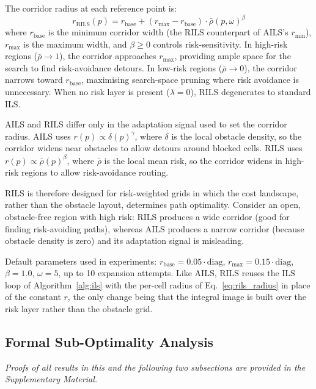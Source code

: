 \documentclass[preprint,12pt,authoryear]{elsarticle}
\begin{document}
The corridor radius at each reference point is:
\begin{equation}\label{eq:rils_radius}
    r_{\text{RILS}}(p) = r_{\text{base}} + (r_{\max} - r_{\text{base}}) \cdot \bar{\rho}(p, \omega)^\beta
\end{equation}
where $r_{\text{base}}$ is the minimum corridor width (the RILS counterpart of AILS's $r_{\min}$), $r_{\max}$ is the maximum width, and $\beta \geq 0$ controls risk-sensitivity.
In high-risk regions ($\bar{\rho} \to 1$), the corridor approaches $r_{\max}$, providing ample space for the search to find risk-avoidance detours.
In low-risk regions ($\bar{\rho} \to 0$), the corridor narrows toward $r_{\text{base}}$, maximising search-space pruning where risk avoidance is unnecessary.
When no risk layer is present ($\lambda = 0$), RILS degenerates to standard ILS.

AILS and RILS differ only in the adaptation signal used to set the corridor radius. AILS uses $r(p) \propto \delta(p)^\gamma$, where $\delta$ is the local obstacle density, so the corridor widens near obstacles to allow detours around blocked cells. RILS uses $r(p) \propto \bar{\rho}(p)^\beta$, where $\bar{\rho}$ is the local mean risk, so the corridor widens in high-risk regions to allow risk-avoidance routing.

RILS is therefore designed for risk-weighted grids in which the cost landscape, rather than the obstacle layout, determines path optimality.
Consider an open, obstacle-free region with high risk: RILS produces a wide corridor (good for finding risk-avoiding paths), whereas AILS produces a narrow corridor (because obstacle density is zero) and its adaptation signal is misleading.

Default parameters used in experiments: $r_{\text{base}} = 0.05 \cdot \text{diag}$, $r_{\max} = 0.15 \cdot \text{diag}$, $\beta = 1.0$, $\omega = 5$, up to 10 expansion attempts. Like AILS, RILS reuses the ILS loop of Algorithm~\ref{alg:ils} with the per-cell radius of Eq.~\eqref{eq:rils_radius} in place of the constant $r$, the only change being that the integral image is built over the risk layer rather than the obstacle grid.

\subsection{Formal Sub-Optimality Analysis}\label{subsec:formal}
\emph{Proofs of all results in this and the following two subsections are provided in the Supplementary Material.}
\end{document}

